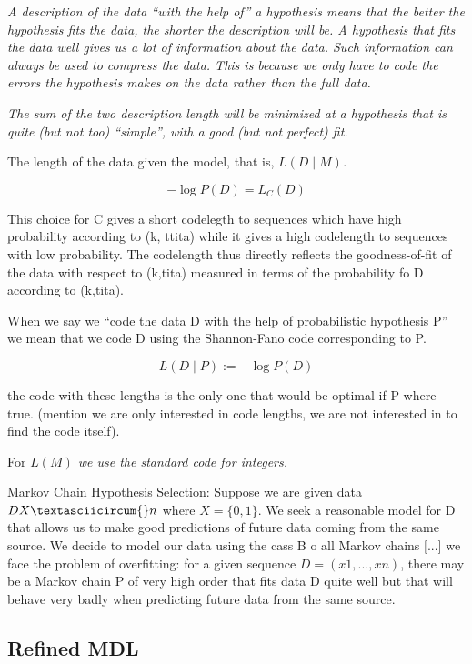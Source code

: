 {\emph{A description of the data ``with the help of'' a hypothesis
means that the better the hypothesis fits the data, the shorter the
description will be. A hypothesis that fits the data well gives us
a lot of information about the data. Such information can always be
used to compress the data. This is because we only have to code the
errors the hypothesis makes on the data rather than the full data.}

\emph{The sum of the two description length will be minimized at a
hypothesis that is quite (but not too) ``simple'', with a good (but
not perfect) fit.}

The length of the data given the model, that is, \emph{$L(D\mid M)$.}

\[
-\log P(D)=L_{C}(D)
\]


This choice for C gives a short codelegth to sequences which have
high probability according to (k, ttita) while it gives a high codelength
to sequences with low probability. The codelength thus directly reflects
the goodness-of-fit of the data with respect to (k,tita) measured
in terms of the probability fo D according to (k,tita).

When we say we ``code the data D with the help of probabilistic hypothesis
P'' we mean that we code D using the Shannon-Fano code corresponding
to P.

\[
L(D\mid P):=-\log P(D)
\]


the code with these lengths is the only one that would be optimal
if P where true. (mention we are only interested in code lengths,
we are not interested in to find the code itself).

For \emph{$L(M)$ we use the standard code for integers.}

\begin{example}
Markov Chain Hypothesis Selection: Suppose we are given data $D X\textasciicircum{}n$
where $X=\{0,1\}$. We seek a reasonable model for D that allows us to
make good predictions of future data coming from the same source.
We decide to model our data using the cass B o all Markov chains ${[}...{]}$
we face the problem of overfitting: for a given sequence $D=(x1,...,xn)$,
there may be a Markov chain P of very high order that fits data D
quite well but that will behave very badly when predicting future
data from the same source.
\end{example}

\subsection{Refined MDL}

}
